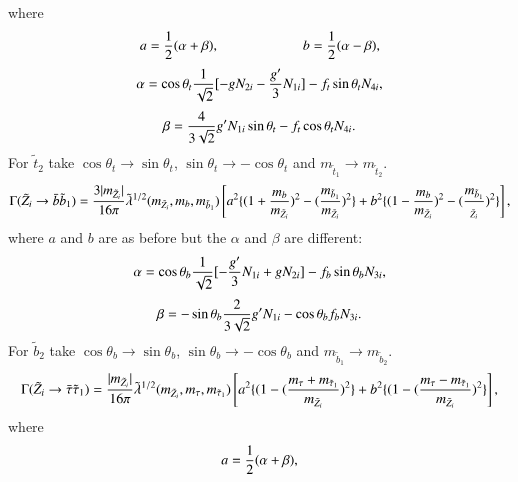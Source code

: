 \documentclass[final,3p,times,pdflatex]{elsarticle}
\begin{document}
where
\begin{equation}
a = {1 \over 2}(\alpha+\beta), \:  \:   \: \: \:  \: \:\:  \: \: \:  \: \: \:  \: \: \:  \: \: \:  \: \: \:  \: \: \: \:  b = {1 \over 2}(\alpha-\beta),
\end{equation}
\begin{equation}
\alpha = \cos \theta_t {1 \over \sqrt{2}} [-g N_{2i} - {g' \over 3} N_{1i}] - f_t \sin \theta_t N_{4i},
\end{equation}
\begin{equation}
\beta = {4 \over 3\sqrt{2}} g' N_{1i} \sin \theta_t - f_t \cos \theta_t N_{4i}.
\end{equation}
For $\tilde{t}_2$ take $\cos\theta_t \rightarrow \sin\theta_t$, $\sin\theta_t \rightarrow -\cos\theta_t$ and $m_{\tilde{t}_1} \rightarrow m_{\tilde{t}_2}$.
\begin{equation}\label{neutbsb1}
\Gamma (\tilde{Z}_i \rightarrow \bar{b} \tilde{b}_{1}) = {3 |m_{\tilde{Z}_i}| \over 16\pi} \tilde{\lambda}^{1/2} (m_{\tilde{Z}_i}, m_b, m_{\tilde{b}_{1}}) \left[a^2\{(1+{m_b \over m_{\tilde{Z}_i}})^2 - ({m_{\tilde{b}_1} \over m_{\tilde{Z}_i}})^2\} + b^2\{(1-{m_b \over m_{\tilde{Z}_i}})^2 - ({m_{\tilde{b}_1} \over _{\tilde{Z}_i}})^2\}\right],
\end{equation} 
where $a$ and $b$ are as before but the $\alpha$ and $\beta$ are different:
\begin{equation}
\alpha = \cos \theta_b {1 \over \sqrt{2}} [-{g' \over 3} N_{1i} + g N_{2i}] - f_b \sin \theta_b N_{3i},
\end{equation}
\begin{equation}
\beta = -\sin \theta_b {2 \over 3\sqrt{2}}g' N_{1i}  - \cos \theta_b f_b N_{3i}.
\end{equation}
For $\tilde{b}_2$ take $\cos\theta_b \rightarrow \sin\theta_b$, $\sin\theta_b \rightarrow -\cos\theta_b$ and 	$m_{\tilde{b}_1} \rightarrow m_{\tilde{b}_2}$.
\begin{equation}\label{neuttaustau1}
\Gamma (\tilde{Z}_i \rightarrow \bar{\tau} \tilde{\tau}_{1}) = {|m_{\tilde{Z}_i}| \over 16\pi} \tilde{\lambda}^{1/2} (m_{\tilde{Z}_i}, m_\tau, m_{\tilde{\tau}_{1}}) \left[ a^2\{(1-({m_\tau + m_{\tilde{\tau}_1} \over m_{\tilde{Z}_i}})^2\} + b^2\{(1-({m_\tau - m_{\tilde{\tau}_1} \over m_{\tilde{Z}_i}})^2\} \right],
\end{equation} 
where
\begin{equation}
a = {1 \over 2} (\alpha + \beta) ,
\end{equation}
\end{document}
